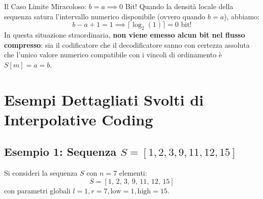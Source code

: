 \begin{noteblock}{Il Caso Limite Miracoloso: $b = a \implies 0$ Bit!}
Quando la densit\`a locale della sequenza satura l'intervallo numerico disponibile (ovvero quando $b = a$), abbiamo:
\begin{equation}
  b - a + 1 = 1 \implies \lceil \log_2(1) \rceil = 0 \text{ bit!}
\end{equation}
In questa situazione straordinaria, \textbf{non viene emesso alcun bit nel flusso compresso}: sia il codificatore che il decodificatore sanno con certezza assoluta che l'unico valore numerico compatibile con i vincoli di ordinamento \`e $S[m] = a = b$.
\end{noteblock}

\FloatBarrier
\section{Esempi Dettagliati Svolti di Interpolative Coding}
\label{sec:esempi-svolti-interpolative}

\subsection{Esempio 1: Sequenza $S = [1, 2, 3, 9, 11, 12, 15]$}
\label{subsec:es1-interpolative}

\begin{example}
Si consideri la sequenza $S$ con $n = 7$ elementi:
\begin{equation*}
  S = [1, \, 2, \, 3, \, 9, \, 11, \, 12, \, 15]
\end{equation*}
con parametri globali $l = 1, r = 7, \text{low} = 1, \text{high} = 15$.
\end{example}

